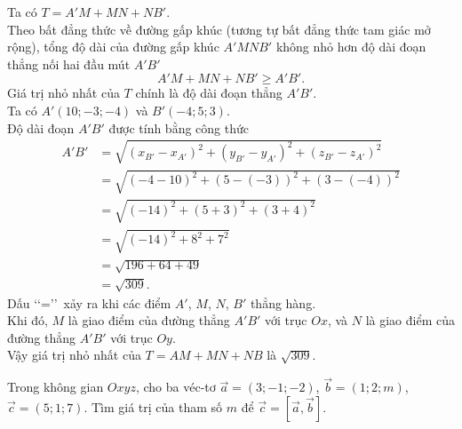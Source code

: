 \begin{bt}
{\begin{enumerate}[1.]
			Ta có $T=A'M+MN+NB'$. \\
			Theo bất đẳng thức về đường gấp khúc (tương tự bất đẳng thức tam giác mở rộng), tổng độ dài của đường gấp khúc $A'MNB'$ không nhỏ hơn độ dài đoạn thẳng nối hai đầu mút $A'B'$
			\begin{equation*}
				A'M + MN + NB' \geq A'B'.
			\end{equation*}
			Giá trị nhỏ nhất của $T$ chính là độ dài đoạn thẳng $A'B'$. \\
			Ta có $A'(10;-3;-4)$ và $B'(-4;5;3)$.\\
			Độ dài đoạn $A'B'$ được tính bằng công thức
			\begin{align*}
				A'B' &= \sqrt{(x_{B'} - x_{A'})^2 + (y_{B'} - y_{A'})^2 + (z_{B'} - z_{A'})^2} \\
				&= \sqrt{(-4-10)^2 + (5-(-3))^2 + (3-(-4))^2} \\
				&= \sqrt{(-14)^2 + (5+3)^2 + (3+4)^2} \\
				&= \sqrt{(-14)^2 + 8^2 + 7^2} \\
				&= \sqrt{196 + 64 + 49} \\
				&= \sqrt{309}.
			\end{align*}
			Dấu \lq\lq=\rq\rq~xảy ra khi các điểm $A'$, $M$, $N$, $B'$ thẳng hàng.\\ Khi đó, $M$ là giao điểm của đường thẳng $A'B'$ với trục $Ox$, và $N$ là giao điểm của đường thẳng $A'B'$ với trục $Oy$.\\
			Vậy giá trị nhỏ nhất của $T=AM+MN+NB$ là $\sqrt{309}$.
		\end{enumerate}
	}
\end{bt}

\begin{bt}%
	Trong không gian $Oxyz$, cho ba véc-tơ $\vec{a}= (3; -1; -2)$, $\vec{b}= (1; 2; m)$, $\vec{c}= (5; 1; 7)$. Tìm giá trị của tham số $m$ để $\vec{c}= \left[ \vec{a}, \vec{b}\right]$.
\end{bt}
